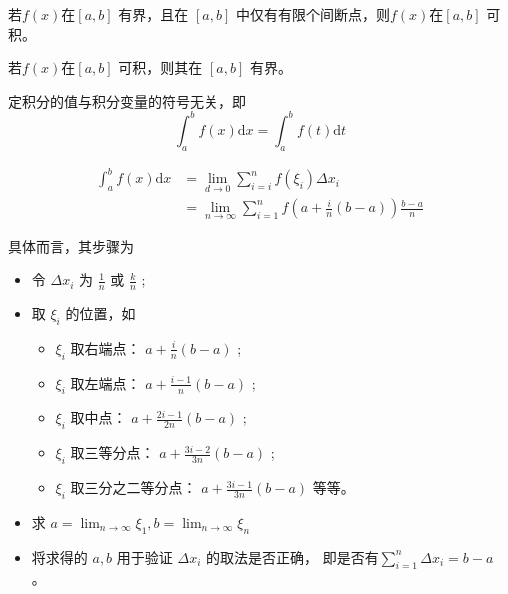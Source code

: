 \begin{Theo}[]

    若$ f(x) $在$ [a,b] $ 有界，且在 $ [a,b] $ 中仅有有限个间断点，则$ f(x) $在$ [a,b] $ 可积。
\end{Theo}

\begin{Theo}[可积必有界]

    若$ f(x) $在$ [a,b] $ 可积，则其在 $ [a,b] $ 有界。
\end{Theo}

\begin{Theo}[定积分值的变量符号无关性]

    定积分的值与积分变量的符号无关，即$$
        \int_a^b f(x)\mathrm{d}x=\int_a^b f(t)\mathrm{d}t
    $$ 
\end{Theo}


\begin{equation*}
    \begin{aligned}
        \int_a^b f(x)\mathrm{d}x&={\displaystyle\lim_{d\rightarrow 0}}\sum_{i=i}^nf(\xi_i)\Delta x_i\\
        &={\displaystyle\lim_{n\rightarrow \infty}}\sum_{i=1}^n f(a+\frac{i}{n}(b-a))\frac{b-a}{n}
    \end{aligned}
\end{equation*}

具体而言，其步骤为
\begin{itemize}
    \item 令 $ \Delta x_i $ 为 $ \frac{1}{n} $ 或 $ \frac{k}{n} $ ;
    \item 取 $ \xi_i $ 的位置，如\begin{itemize}
        \item $ \xi_i $ 取右端点： $ a+\frac{i}{n}(b-a) $ ;
        \item $ \xi_i $ 取左端点： $ a+\frac{i-1}{n}(b-a) $ ;
        \item $ \xi_i $ 取中点： $ a+\frac{2i-1}{2n}(b-a) $ ;
        \item $ \xi_i $ 取三等分点： $ a+\frac{3i-2}{3n}(b-a) $ ;
        \item $ \xi_i $ 取三分之二等分点： $ a+\frac{3i-1}{3n}(b-a) $ 等等。
    \end{itemize}
    \item 求 $ a={\displaystyle\lim_{n\rightarrow \infty}}\xi_1,b={\displaystyle\lim_{n\rightarrow \infty}}\xi_n $
    \item 将求得的 $ a,b $ 用于验证 $ \Delta x_i $ 的取法是否正确，
    即是否有$ \sum_{i=1}^n \Delta x_i = b-a $ 。
\end{itemize}

